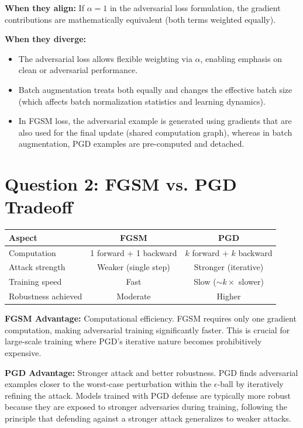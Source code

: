 \documentclass[11pt]{article}
\begin{document}
\textbf{When they align:} If $\alpha = 1$ in the adversarial loss formulation, the gradient contributions are mathematically equivalent (both terms weighted equally).

\textbf{When they diverge:}
\begin{itemize}
    \item The adversarial loss allows flexible weighting via $\alpha$, enabling emphasis on clean or adversarial performance.
    \item Batch augmentation treats both equally and changes the effective batch size (which affects batch normalization statistics and learning dynamics).
    \item In FGSM loss, the adversarial example is generated using gradients that are also used for the final update (shared computation graph), whereas in batch augmentation, PGD examples are pre-computed and detached.
\end{itemize}

\section{Question 2: FGSM vs. PGD Tradeoff}

\begin{table}[h]
\centering
\begin{tabular}{lcc}
\toprule
\textbf{Aspect} & \textbf{FGSM} & \textbf{PGD} \\
\midrule
Computation & 1 forward + 1 backward & $k$ forward + $k$ backward \\
Attack strength & Weaker (single step) & Stronger (iterative) \\
Training speed & Fast & Slow ($\sim k\times$ slower) \\
Robustness achieved & Moderate & Higher \\
\bottomrule
\end{tabular}
\end{table}

\textbf{FGSM Advantage:} Computational efficiency. FGSM requires only one gradient computation, making adversarial training significantly faster. This is crucial for large-scale training where PGD's iterative nature becomes prohibitively expensive.

\textbf{PGD Advantage:} Stronger attack and better robustness. PGD finds adversarial examples closer to the worst-case perturbation within the $\epsilon$-ball by iteratively refining the attack. Models trained with PGD defense are typically more robust because they are exposed to stronger adversaries during training, following the principle that defending against a stronger attack generalizes to weaker attacks.
\end{document}
